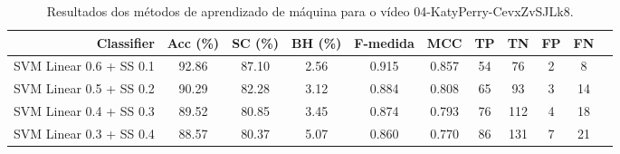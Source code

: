 \begin{table}[!htb]
\centering
\caption{Resultados dos métodos de aprendizado de máquina para o vídeo 04-KatyPerry-CevxZvSJLk8.}
\label{tab:04-KatyPerry-CevxZvSJLk8}
\begin{tabular}{r|c|c|c|c|c|c|c|c|c|c}
\hline\hline
Classifier & Acc (\%) & SC (\%) & BH (\%) & F-medida & MCC & TP & TN & FP & FN \\ \hline
SVM Linear 0.6 + SS 0.1 & 92.86 & 87.10 & 2.56 & 0.915 & 0.857 & 54 & 76 & 2 & 8 \\ 
SVM Linear 0.5 + SS 0.2 & 90.29 & 82.28 & 3.12 & 0.884 & 0.808 & 65 & 93 & 3 & 14 \\ 
SVM Linear 0.4 + SS 0.3 & 89.52 & 80.85 & 3.45 & 0.874 & 0.793 & 76 & 112 & 4 & 18 \\ 
SVM Linear 0.3 + SS 0.4 & 88.57 & 80.37 & 5.07 & 0.860 & 0.770 & 86 & 131 & 7 & 21 \\ 
\hline\hline
\end{tabular}
\end{table}
